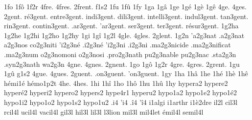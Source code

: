 {1fo
1f\^o
1f2r
4fre.
4fres.
2frent. %
f1s2
1fu
1f\^u
1fy
1ga
1g\^a
1ge
1g\'e
1g\`e
1g\^e
4ge.
4ges.
       2gent.
   r\'e3gent.
  entre3gent.
   indi3gent.
   dili3gent.
intelli3gent.
  indul3gent.
    tan3gent.
    rin3gent.
 contin3gent.
    .ar3gent.
    'ar3gent.
    ser3gent.
    ter3gent.
r\'esur3gent.
%
1g2ha
1g2he
1g2hi
1g2ho
1g2hy
1gi
1g\^i
1g2l
4gle.
4gles.
2glent. %
    1g2n
  'a2g3nat     %
  .a2g3nat     %
   a2g3nos     %
  co2g3niti    %
  'i2g3n\'e    %
  .i2g3n\'e    %
  'i2g3ni      %
  .i2g3ni      %
 .ma2g3nicide  %
 .ma2g3nificat %
 .ma2g3num     %
   o2g3nomoni  %
   o2g3nosi    %
.pro2g3nath    %
  pu2g3nable   %
  pu2g3nac     %
.sta2g3n
.syn2g3nath    %
  wa2g3n
4gne.
4gnes.
2gnent. %
1go
1g\^o
1g2r
4gre.
4gres.
2grent. %
1gu
1g\^u
g1s2
4gue.
4gues.
   2guent.
.on3guent.
'on3guent.
%
1gy
1ha
1h\^a
1he
1h\'e
1h\`e
1h\^e
                    h\'emi1\'e
                    h\'emo1p2t
4he.
4hes.
1hi
1h\^i
1ho
1h\^o
1hu
1h\^u
1hy
                    hypera2
                    hypere2
                    hyper\'e2
                    hyperi2
                    hypero2
                    hypers2
                    hype4r1
                    hyperu2
                    hypo1a2
                    hypo1e2 %
                    hypo1\'e2
                    hypo1i2
                    hypo1o2
                    hypo1s2
                    hypo1u2
.i4
'i4
.\^i4
'\^i4
                    i1algi
                    i1arthr
                    i1\`e2dre
    il2l 
   cil3l
  rcil4l
  ucil4l
 vacil4l
   gil3l
   hil3l
   lil3l
     l3lion
   mil3l
   mil4let
\'emil4l
 semil4l
}
